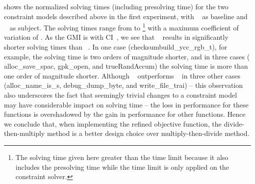  shows the normalized solving times
(including \gls{presolving} time) for the two \glspl{constraint model}
described above in the first experiment, with ~\modelA{} as \gls{baseline} and ~\modelB{}
as \gls{subject}.
%
The solving times range from
\printMinSolvingTime{
  \NewOpCostFunVsOldPrePlusSolvingTimeSpeedupPrePlusSolvingTimeAvgMin,
  \NewOpCostFunVsOldPrePlusSolvingTimeSpeedupBaselinePrePlusSolvingTimeAvgMin
} to
\printMaxSolvingTime{
  \NewOpCostFunVsOldPrePlusSolvingTimeSpeedupPrePlusSolvingTimeAvgMax,
  \NewOpCostFunVsOldPrePlusSolvingTimeSpeedupBaselinePrePlusSolvingTimeAvgMax
}%
%
\footnote{%
  The solving time given here greater than the time limit because it also
  includes the \gls{presolving} time while the time limit is only applied on the
  \gls{constraint solver}.%
}
%
with a maximum coefficient of variation of
\numMaxOf{
  \NewOpCostFunVsOldPrePlusSolvingTimeSpeedupPrePlusSolvingTimeCvMax,
  \NewOpCostFunVsOldPrePlusSolvingTimeSpeedupBaselinePrePlusSolvingTimeCvMax
}.
%
As the \gls{GMI} is \printGMI{%
  \NewOpCostFunVsOldPrePlusSolvingTimeSpeedupPrePlusSolvingTimeRegularSpeedupGmean%
} with \gls{CI}~\printGMICI{%
  \NewOpCostFunVsOldPrePlusSolvingTimeSpeedupPrePlusSolvingTimeRegularSpeedupCiMin%
}{%
  \NewOpCostFunVsOldPrePlusSolvingTimeSpeedupPrePlusSolvingTimeRegularSpeedupCiMax%
}, we see that ~\modelB{} results in significantly
shorter solving times than ~\modelA.
%
In one case (checksum{\codeFont build\_ycc\_rgb\_t}), for example, the solving
time is two orders of magnitude shorter, and in three cases ({\codeFont
  alloc\_save\_spac}, {\codeFont gpk\_open}, and {\codeFont trueRandAccum}) the
solving time is more than one order of magnitude shorter.
%
Although ~\modelA{} outperforms ~\modelB{} in three other cases ({\codeFont alloc\_name\_is\_s},
{\codeFont debug\_dump\_byte}, and {\codeFont write\_file\_trai}) -- this
observation also underscores the fact that seemingly trivial changes to a
\gls{constraint model} may have considerable impact on solving time -- the loss
in performance for these \glspl{function} is overshadowed by the gain in
performance for other \glspl{function}.
%
Hence we conclude that, when implementing the refined \gls{objective function},
the \gls{divide-then-multiply method} is a better design choice over
\gls{multiply-then-divide method}.

